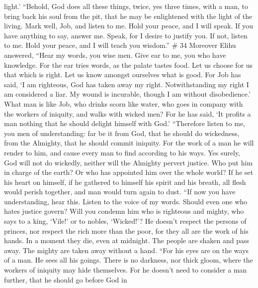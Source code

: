 light.'  ``Behold, God does all these things, twice, yes
three times, with a man,  to bring back his soul from the
pit, that he may be enlightened with the light of the living.
 Mark well, Job, and listen to me. Hold your peace, and I
will speak.  If you have anything to say, answer me. Speak,
for I desire to justify you.  If not, listen to me. Hold
your peace, and I will teach you wisdom.'' \# 34  Moreover
Elihu answered,  ``Hear my words, you wise men. Give ear to
me, you who have knowledge.  For the ear tries words, as the
palate tastes food.  Let us choose for us that which is
right. Let us know amongst ourselves what is good.  For Job
has said, `I am righteous, God has taken away my right. 
Notwithstanding my right I am considered a liar. My wound is incurable,
though I am without disobedience.'  What man is like Job,
who drinks scorn like water,  who goes in company with the
workers of iniquity, and walks with wicked men?  For he has
said, `It profits a man nothing that he should delight himself with
God.'  ``Therefore listen to me, you men of understanding:
far be it from God, that he should do wickedness, from the Almighty,
that he should commit iniquity.  For the work of a man he
will render to him, and cause every man to find according to his ways.
 Yes surely, God will not do wickedly, neither will the
Almighty pervert justice.  Who put him in charge of the
earth? Or who has appointed him over the whole world?  If
he set his heart on himself, if he gathered to himself his spirit and
his breath,  all flesh would perish together, and man would
turn again to dust.  ``If now you have understanding, hear
this. Listen to the voice of my words.  Should even one who
hates justice govern? Will you condemn him who is righteous and mighty,
 who says to a king, `Vile!' or to nobles, `Wicked!'?
 He doesn't respect the persons of princes, nor respect the
rich more than the poor, for they all are the work of his hands.
 In a moment they die, even at midnight. The people are
shaken and pass away. The mighty are taken away without a hand.
 ``For his eyes are on the ways of a man. He sees all his
goings.  There is no darkness, nor thick gloom, where the
workers of iniquity may hide themselves.  For he doesn't
need to consider a man further, that he should go before God in
